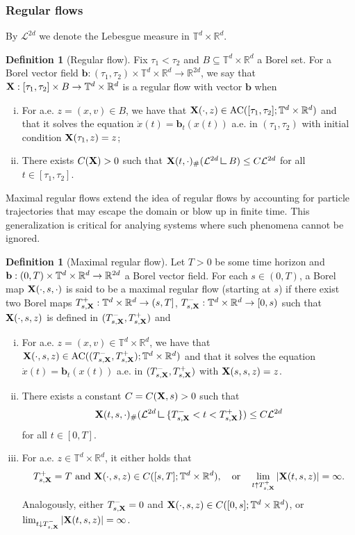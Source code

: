 \documentclass[11pt,reqno,a4paper]{amsart}
\newcommand{\R}{\mathbb{R}}
\theoremstyle{definition}
\newtheorem{definition}[lemma]{Definition}
\theoremstyle{remark}
\numberwithin{equation}{section}
\newcommand{\T} {\mathbb T}
\newcommand{\bfb}{{\bf b}}
\newcommand{\bfX}{{\bf X}}
\newcommand{\calL}{\mathcal L}
\newcommand{\AC}{\operatorname{AC}}
\newcommand{\lefthalfcup}{\mathbin{\vrule height 1.6ex depth 0pt width
0.13ex\vrule height 0.13ex depth 0pt width 1.3ex}}
\begin{document}
\subsubsection{Regular flows}
By $\calL^{2d}$ we denote the Lebesgue measure in $\T^d\times\R^d$.

\begin{definition}[Regular flow]%
Fix $\tau_1<\tau_2$ and $B \subseteq \T^d\times\R^d$ a Borel set. For a Borel vector field $\textbf{b}:(\tau_1,\tau_2)\times\T^d\times\R^d\to \R^{2d}$,
we say that $\bfX:[\tau_1,\tau_2]\times B\to \T^{d}\times \R^d$ is a regular flow with vector $\textbf{b}$ when
\begin{enumerate}[(i)]
\item  For a.e. $z=(x,v)\in B$, we have that $\bfX(\cdot,z)\in \AC([\tau_1,\tau_2];\T^d\times\R^d)$ and that it solves the equation $\dot{x}(t)=\textbf{b}_t(x(t))$ a.e. in $(\tau_1,\tau_2)$ with initial condition $\bfX(\tau_1,z)=z$;
\item There exists $C(\bfX) > 0$ such that $\bfX(t,\cdot)_\#(\mathcal{L}^{2d}\lefthalfcup B)\leq C\mathcal{L}^{2d}$ for all $t\in [\tau_1,\tau_2]$.
\end{enumerate}
\end{definition}

Maximal regular flows extend the idea of regular flows by accounting for particle trajectories that may escape the domain or blow up in finite time. This generalization is critical for analying systems where such phenomena cannot be ignored.


\begin{definition}[Maximal regular flow]%
Let $T>0$ be some time horizon and $\bfb:(0,T)\times\T^d\times\R^d \to \R^{2d}$ a Borel vector field. For each $s\in(0,T)$, a Borel map $\bfX(\cdot,s,\cdot)$ is said to be a maximal regular flow (starting at $s$) if there exist two Borel maps $T^+_{s,\bfX}:\T^d\times\R^d\to (s,T]$, $T^-_{s,\bfX}:\T^d\times\R^d\to [0,s)$ such that $\bfX(\cdot,s,z)$ is defined in $(T^-_{s,\bfX},T^+_{s,\bfX})$ and
\begin{enumerate}[(i)]
\item For a.e. $z=(x,v)\in\T^d\times\R^d$, we have that $\bfX(\cdot,s,z)\in \AC((T^-_{s,\bfX},T^+_{s,\bfX});\T^d\times\R^d)$ and that it solves the equation $\dot{x}(t)=\textbf{b}_t(x(t))$ a.e. in $(T^-_{s,\bfX},T^+_{s,\bfX})$ with $\bfX(s,s,z)=z$.
\item There exists a constant $C = C(\bfX,s) > 0$ such that 
\[
\bfX(t,s,\cdot)_\#(\mathcal{L}^{2d}\lefthalfcup \{T^-_{s,\bfX}<t<T^+_{s,\bfX}\})\leq C\mathcal{L}^{2d}
\] 
for all $t\in [0,T]$.
\item For a.e. $z\in\T^d\times\R^d$, it either holds that 
\[
T^+_{s,\bfX}=T \mbox{ and } \bfX(\cdot,s,z)\in C([s,T];\T^d\times\R^d),\quad \mbox{or} \quad \lim_{t\uparrow T^+_{s,\bfX}}|\bfX(t,s,z)|=\infty. 
\]Analogously, either $T^-_{s,\bfX}=0$ and $\bfX(\cdot,s,z)\in C([0,s];\T^d\times\R^d)$, or $\lim_{t\downarrow T^-_{s,\bfX}}|\bfX(t,s,z)|=\infty$.
\end{enumerate}
\end{definition}
\end{document}
